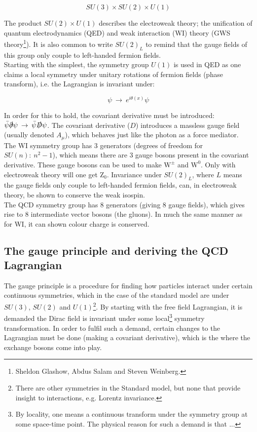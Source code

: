 \documentclass[11pt,a4paper]{article}
\begin{document}
\begin{equation}
	SU(3) \times SU(2) \times U(1)
\end{equation}

The product $SU(2) \times U(1)$ describes the electroweak theory; the unification of quantum electrodynamics (QED) and weak interaction (WI) theory (GWS theory\footnote{Sheldon Glashow, Abdus Salam and Steven Weinberg.}). It is also common to write $SU(2)_L$ to remind that the gauge fields of this group only couple to left-handed fermion fields.\\

Starting with the simplest, the symmetry group $U(1)$ is used in QED as one claims a local symmetry under unitary rotations of fermion fields (phase transform), i.e. the Lagrangian is invariant under:

\begin{equation}
	\psi \:\rightarrow\: e^{i\theta(x)}\psi
\end{equation} 

In order for this to hold, the covariant derivative must be introduced: $\bar{\psi}\slashed\partial\psi \:\rightarrow\: \bar{\psi}\slashed D\psi$. The covariant derivative ($D$) introduces a massless gauge field (usually denoted $A_\mu$), which behaves just like the photon as a force mediator.\\

The WI symmetry group has 3 generators (degrees of freedom for $SU(n):\:n^2-1$), which means there are 3 gauge bosons present in the covariant derivative. These gauge bosons can be used to make $\text{W}^\pm$ and $\text{W}^0$. Only with electroweak theory will one get $\text{Z}_ 0$. Invariance under $SU(2)_L$, where $L$ means the gauge fields only couple to left-handed fermion fields, can, in electroweak theory, be shown to conserve the weak isospin.\\

The QCD symmetry group has 8 generators (giving 8 gauge fields), which gives rise to 8 intermediate vector bosons (the gluons). In much the same manner as for WI, it can shown colour charge is conserved.

\subsection{The gauge principle and deriving the QCD Lagrangian}
The gauge principle is a procedure for finding how particles interact under certain continuous symmetries, which in the case of the standard model are under $SU(3)$, $SU(2)$ and $U(1)$\footnote{There are other symmetries in the Standard model, but none that provide insight to interactions, e.g. Lorentz invariance.}. By starting with the free field Lagrangian, it is demanded the Dirac field is invariant under some local\footnote{By locality, one means a continuous transform under the symmetry group at some space-time point. The physical reason for such a demand is that ...} symmetry transformation. In order to fulfil such a demand, certain changes to the Lagrangian must be done (making a covariant derivative), which is the where the exchange bosons come into play.\\
\end{document}

